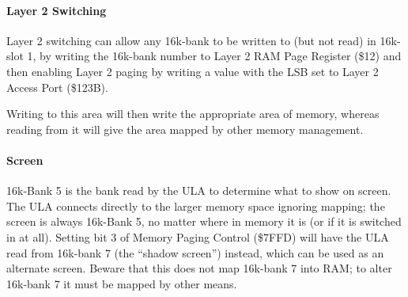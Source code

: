 \paragraph{Layer 2 Switching}
Layer 2 switching can allow any 16k-bank to be written to (but not
read) in 16k-slot 1, by writing the 16k-bank number to Layer 2 RAM
Page Register (\$12) and then enabling Layer 2 paging by writing a
value with the LSB set to Layer 2 Access Port (\$123B).

Writing to this area will then write the appropriate area of memory,
whereas reading from it will give the area mapped by other memory
management.

\paragraph{Screen}
16k-Bank 5 is the bank read by the ULA to determine what to show on
screen. The ULA connects directly to the larger memory space ignoring
mapping; the screen is always 16k-Bank 5, no matter where in memory it
is (or if it is switched in at all). Setting bit 3 of Memory Paging
Control (\$7FFD) will have the ULA read from 16k-bank 7 (the ``shadow
screen'') instead, which can be used as an alternate screen. Beware
that this does not map 16k-bank 7 into RAM; to alter 16k-bank 7 it
must be mapped by other means.
